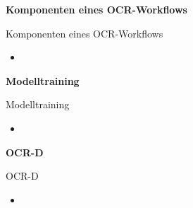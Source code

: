 \documentclass{bbawslides}
\begin{document}
\begin{bbawpart}{\Large\bf Komponenten eines OCR-Workflows}
\end{bbawpart}

\begin{bbawslide}{Komponenten eines OCR-Workflows}
  \vspace*{7mm}%
  \centerslidestrue%
  \begin{itemize}
    \item
  \end{itemize}
\end{bbawslide}

\begin{bbawpart}{\Large\bf Modelltraining}
\end{bbawpart}

\begin{bbawslide}{Modelltraining}
  \vspace*{7mm}%
  \centerslidestrue%
  \begin{itemize}
    \item
  \end{itemize}
\end{bbawslide}

\begin{bbawpart}{\Large\bf OCR-D}
\end{bbawpart}

\begin{bbawslide}{OCR-D}
  \vspace*{7mm}%
  \centerslidestrue%
  \begin{itemize}
    \item
  \end{itemize}
\end{bbawslide}
\end{document}
